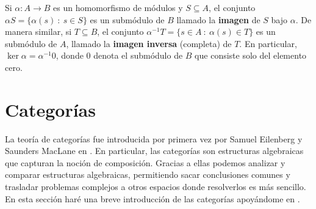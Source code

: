 Si \(\alpha: A \rightarrow B\) es un homomorfismo de módulos y \(S \subseteq A\), el conjunto \(\alpha S = \{\alpha(s) \ : \ s \in S \} \) es un submódulo de \(B\) llamado la \textbf{imagen} de \(S\) bajo \(\alpha\). De manera similar, si \(T \subseteq B\), el conjunto \(\alpha^{-1}T = \{ s \in A \ : \ \alpha(s) \in T \} \) es un submódulo de \(A\), llamado la \textbf{imagen inversa} (completa) de \(T\). En particular, \(\ker \alpha = \alpha^{-1}0\), donde \(0\) denota el submódulo de \(B\) que consiste solo del elemento cero.

%
%

\section{Categorías}
\label{sec:cat}

La teoría de categorías fue introducida por primera vez por Samuel Eilenberg y Saunders MacLane en \cite{eilenberg1945general}. En particular, las categorías son estructuras algebraicas que capturan la noción de composición. Gracias a ellas podemos analizar y comparar estructuras algebraicas, permitiendo sacar conclusiones comunes y trasladar problemas complejos a otros espacios donde resolverlos es más sencillo. En esta sección haré una breve introducción de las categorías apoyándome en \cite{mac2013categories}.

